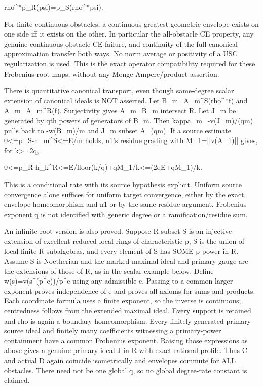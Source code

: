  rho\textasciicircum{}*p\_R(psi)=p\_S(rho\textasciicircum{}*psi).

For finite continuous obstacles, a continuous greatest geometric envelope exists on one side iff it exists on the other. In particular the all-obstacle CE property, any genuine continuous-obstacle CE failure, and continuity of the full canonical approximation transfer both ways. No norm average or positivity of a USC regularization is used. This is the exact operator compatibility required for these Frobenius-root maps, without any Monge-Ampere/product assertion.

There is quantitative canonical transport, even though same-degree scalar extension of canonical ideals is NOT asserted. Let B\_m=A\_m\textasciicircum{}S(rho\textasciicircum{}*f) and A\_m=A\_m\textasciicircum{}R(f). Surjectivity gives A\_m=B\_m intersect R. Let J\_m be generated by qth powers of generators of B\_m. Then kappa\_m=-v(J\_m)/(qm) pulls back to -w(B\_m)/m and J\_m subset A\_(qm). If a source estimate 0\textless{}=p\_S-h\_m\textasciicircum{}S\textless{}=E/m holds, n1's residue grading with M\_1=||v(A\_1)|| gives, for k\textgreater{}=2q,

 0\textless{}=p\_R-h\_k\textasciicircum{}R\textless{}=E/floor(k/q)+qM\_1/k\textless{}=(2qE+qM\_1)/k.

This is a conditional rate with its source hypothesis explicit. Uniform source convergence alone suffices for uniform target convergence, either by the exact envelope homeomorphism and n1 or by the same residue argument. Frobenius exponent q is not identified with generic degree or a ramification/residue sum.

An infinite-root version is also proved. Suppose R subset S is an injective extension of excellent reduced local rings of characteristic p, S is the union of local finite R-subalgebras, and every element of S has SOME p-power in R. Assume S is Noetherian and the marked maximal ideal and primary gauge are the extensions of those of R, as in the scalar example below. Define w(s)=v(s\textasciicircum{}(p\textasciicircum{}e))/p\textasciicircum{}e using any admissible e. Passing to a common larger exponent proves independence of e and proves all axioms for sums and products. Each coordinate formula uses a finite exponent, so the inverse is continuous; centredness follows from the extended maximal ideal. Every support is retained and rho is again a boundary homeomorphism. Every finitely generated primary source ideal and finitely many coefficients witnessing a primary-power containment have a common Frobenius exponent. Raising those expressions as above gives a genuine primary ideal J in R with exact rational profile. Thus C and actual D again coincide isometrically and envelopes commute for ALL obstacles. There need not be one global q, so no global degree-rate constant is claimed.

